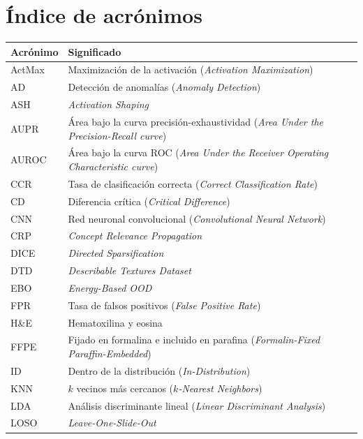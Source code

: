 %

\chapter{Índice de acrónimos}

\begin{longtable}{@{}lp{}@{}}
\toprule
\textbf{Acrónimo} & \textbf{Significado} \\
\midrule
\endhead
\bottomrule
\endlastfoot
ActMax & Maximización de la activación (\emph{Activation Maximization}) \\
AD & Detección de anomalías (\emph{Anomaly Detection}) \\
ASH & \emph{Activation Shaping} \\
AUPR & Área bajo la curva precisión-exhaustividad (\emph{Area Under the Precision-Recall curve}) \\
AUROC & Área bajo la curva ROC (\emph{Area Under the Receiver Operating Characteristic curve}) \\
CCR & Tasa de clasificación correcta (\emph{Correct Classification Rate}) \\
CD & Diferencia crítica (\emph{Critical Difference}) \\
CNN & Red neuronal convolucional (\emph{Convolutional Neural Network}) \\
CRP & \emph{Concept Relevance Propagation} \\
DICE & \emph{Directed Sparsification} \\
DTD & \emph{Describable Textures Dataset} \\
EBO & \emph{Energy-Based OOD} \\
FPR & Tasa de falsos positivos (\emph{False Positive Rate}) \\
H\&E & Hematoxilina y eosina \\
FFPE & Fijado en formalina e incluido en parafina (\emph{Formalin-Fixed Paraffin-Embedded}) \\
ID & Dentro de la distribución (\emph{In-Distribution}) \\
KNN & $k$ vecinos más cercanos (\emph{$k$-Nearest Neighbors}) \\
LDA & Análisis discriminante lineal (\emph{Linear Discriminant Analysis}) \\
LOSO & \emph{Leave-One-Slide-Out} \\

\end{longtable}
